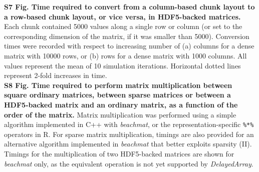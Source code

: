 \documentclass[10pt,letterpaper]{article}
\newcommand{\beachmat}{\textit{beachmat}}
\newcommand{\code}[1]{\texttt{#1}}
\begin{document}
\noindent
\textbf{S7 Fig. Time required to convert from a column-based chunk layout to a row-based chunk layout, or vice versa, in HDF5-backed matrices.}
Each chunk contained 5000 values along a single row or column (or set to the corresponding dimension of the matrix, if it was smaller than 5000).
Conversion times were recorded with respect to increasing number of (a) columns for a dense matrix with 10000 rows, or (b) rows for a dense matrix with 1000 columns.
All values represent the mean of 10 simulation iterations.
Horizontal dotted lines represent 2-fold increases in time.
\\[0.05in]

\noindent
\textbf{S8 Fig. Time required to perform matrix multiplication between square ordinary matrices, between sparse matrices or between a HDF5-backed matrix and an ordinary matrix,
as a function of the order of the matrix.}    
Matrix multiplication was performed using a simple algorithm implemented in C++ with \beachmat{}, or the representation-specific \code{\%*\%} operators in R.
For sparse matrix multiplication, timings are also provided for an alternative algorithm implemented in \beachmat{} that better exploits sparsity (II). 
Timings for the multiplication of two HDF5-backed matrices are shown for \beachmat{} only, as the equivalent operation is not yet supported by \textit{DelayedArray}.
\end{document}
